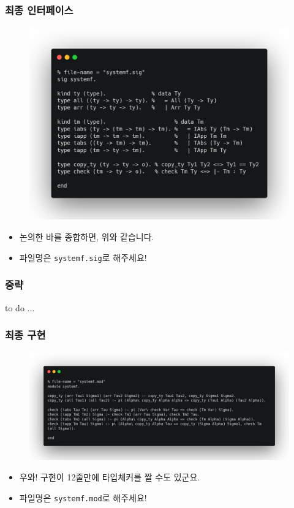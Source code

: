 \documentclass[slidestop,compress,mathserif]{beamer}
\begin{document}
    \begin{frame}
        \frametitle{최종 인터페이스}
        \begin{figure}[h]
            \begin{center}
                \includegraphics[width=0.7\linewidth]{sig.png}
            \end{center}
        \end{figure}
        \begin{itemize}
            \item 논의한 바를 종합하면, 위와 같습니다.
            \item 파일명은 \texttt{systemf.sig}로 해주세요!
        \end{itemize}
    \end{frame}

    \begin{frame}
        \frametitle{중략}
        to do ...
    \end{frame}

    \begin{frame}
        \frametitle{최종 구현}
        \begin{figure}[h]
            \begin{center}
                \includegraphics[width=1.0\linewidth]{mod.png}
            \end{center}
        \end{figure}
        \begin{itemize}
            \item 우와! 구현이 12줄만에 타입체커를 짤 수도 있군요.
            \item 파일명은 \texttt{systemf.mod}로 해주세요!
        \end{itemize}
    \end{frame}
\end{document}
